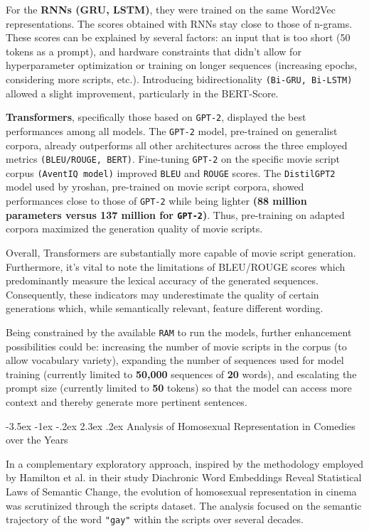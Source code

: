 \documentclass[12pt]{report}
\makeatletter
\renewcommand{\chapter}{\@startsection{chapter}{0}{\z@}
  {-3.5ex \@plus -1ex \@minus -.2ex}
  {2.3ex \@plus.2ex}
  {\normalfont\LARGE\bfseries}}
\makeatother
\begin{document}
For the \textbf{RNNs (GRU, LSTM)}, they were trained on the same Word2Vec representations. The scores obtained with RNNs stay close to those of n-grams. These scores can be explained by several factors: an input that is too short (50 tokens as a prompt), and hardware constraints that didn't allow for hyperparameter optimization or training on longer sequences (increasing epochs, considering more scripts, etc.). Introducing bidirectionality \texttt{(Bi-GRU, Bi-LSTM)} allowed a slight improvement, particularly in the BERT-Score. 

\textbf{Transformers}, specifically those based on \texttt{GPT-2}, displayed the best performances among all models. The \texttt{GPT-2} model, pre-trained on generalist corpora, already outperforms all other architectures across the three employed metrics \texttt{(BLEU/ROUGE, BERT)}. Fine-tuning \texttt{GPT-2} on the specific movie script corpus \texttt{(AventIQ model)} improved \texttt{BLEU} and \texttt{ROUGE} scores. The \texttt{DistilGPT2} model used by yroshan, pre-trained on movie script corpora, showed performances close to those of \texttt{GPT-2} while being lighter \textbf{(88 million parameters versus 137 million for \texttt{GPT-2})}. Thus, pre-training on adapted corpora maximized the generation quality of movie scripts. 

Overall, Transformers are substantially more capable of movie script generation. Furthermore, it's vital to note the limitations of BLEU/ROUGE scores which predominantly measure the lexical accuracy of the generated sequences. Consequently, these indicators may underestimate the quality of certain generations which, while semantically relevant, feature different wording. 

Being constrained by the available \texttt{RAM} to run the models, further enhancement possibilities could be: increasing the number of movie scripts in the corpus (to allow vocabulary variety), expanding the number of sequences used for model training (currently limited to \textbf{50,000} sequences of \textbf{20} words), and escalating the prompt size (currently limited to \textbf{50} tokens) so that the model can access more context and thereby generate more pertinent sentences.

\chapter{Analysis of Homosexual Representation in Comedies over the Years}

In a complementary exploratory approach, inspired by the methodology employed by Hamilton et al. in their study Diachronic Word Embeddings Reveal Statistical Laws of Semantic Change, the evolution of homosexual representation in cinema was scrutinized through the scripts dataset. The analysis focused on the semantic trajectory of the word \texttt{"gay"} within the scripts over several decades. 
\end{document}
